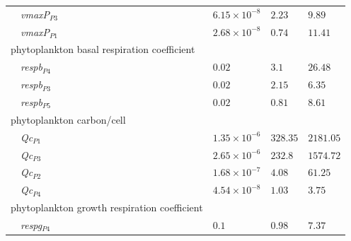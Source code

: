 \documentclass[letterpaper,12pt,oneside]{article}\usepackage[]{graphicx}\usepackage[]{color}
\begin{document}
\begin{table}[!tbp]
{\begin{center}
\begin{tabular}{llll}
~~\textit{vmaxP$_{P3}$}&$6.15\times 10^{-8}$&$2.23$&$9.89$\tabularnewline
~~\textit{vmaxP$_{P1}$}&$2.68\times 10^{-8}$&$0.74$&$11.41$\tabularnewline
\hline
{phytoplankton basal respiration coefficient}&&&\tabularnewline
~~\textit{respb$_{P4}$}&$0.02$&$3.1$&$26.48$\tabularnewline
~~\textit{respb$_{P3}$}&$0.02$&$2.15$&$6.35$\tabularnewline
~~\textit{respb$_{P5}$}&$0.02$&$0.81$&$8.61$\tabularnewline
\hline
{phytoplankton carbon/cell}&&&\tabularnewline
~~\textit{Qc$_{P1}$}&$1.35\times 10^{-6}$&$328.35$&$2181.05$\tabularnewline
~~\textit{Qc$_{P3}$}&$2.65\times 10^{-6}$&$232.8$&$1574.72$\tabularnewline
~~\textit{Qc$_{P2}$}&$1.68\times 10^{-7}$&$4.08$&$61.25$\tabularnewline
~~\textit{Qc$_{P4}$}&$4.54\times 10^{-8}$&$1.03$&$3.75$\tabularnewline
\hline
{phytoplankton growth respiration coefficient}&&&\tabularnewline
~~\textit{respg$_{P4}$}&$0.1$&$0.98$&$7.37$\tabularnewline
\hline
\end{tabular}\end{center}}

\end{table}
\end{document}
